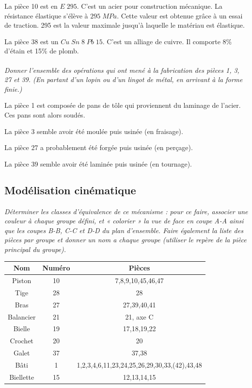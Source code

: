\documentclass[11pt,oneside]{article}
\begin{document}
La pièce 10 est en $E\;295$. C'est un acier pour construction mécanique. La résistance élastique s'élève à $295 \; MPa$. Cette valeur est obtenue grâce à un essai de traction. 295 est la valeur maximale jusqu'à laquelle le matériau est élastique.

La pièce 38 est un  $Cu\; Sn \; 8 \; Pb\; 15$. C'est un alliage de cuivre. Il comporte 8\% d'étain et 15\% de plomb.


\paragraph{}
\textit{Donner l'ensemble des opérations qui ont mené à la fabrication des pièces 1, 3, 27 et 39. (En partant d'un lopin ou d'un lingot de métal, en arrivant à la forme finie.)}

La pièce 1 est composée de pans de tôle qui proviennent du laminage de l'acier. Ces pans sont alors soudés.

La pièce 3 semble avoir été moulée puis usinée (en fraisage).

La pièce 27 a probablement été forgée puis usinée (en perçage).

La pièce 39 semble avoir été laminée puis usinée (en tournage).

\subsection{Modélisation cinématique}
\paragraph{}
\textit{Déterminer les classes d'équivalence de ce mécanisme : pour ce faire, associer une couleur à chaque groupe défini, et « colorier » la vue de face en coupe A-A ainsi que les coupes B-B, C-C et D-D du plan d'ensemble. Faire également la liste des pièces par groupe et donner un nom a chaque groupe (utiliser le repère de la pièce principal du groupe).}

\begin{center}
\begin{tabular}{|c|c|c|}
\hline
Nom & Numéro & Pièces \\
\hline
\hline
Piston&		10&7,8,9,10,45,46,47\\
Tige&		28&28\\
Bras&			27&27,39,40,41\\
Balancier&		21&21, axe C\\
Bielle&		19&17,18,19,22\\
Crochet&		20&20\\
Galet	&	37&37,38\\
Bâti&			1&1,2,3,4,6,11,23,24,25,26,29,30,33,(42),43,48\\
Biellette&			15&12,13,14,15\\
\hline
\end{tabular}
\end{center}
\end{document}
